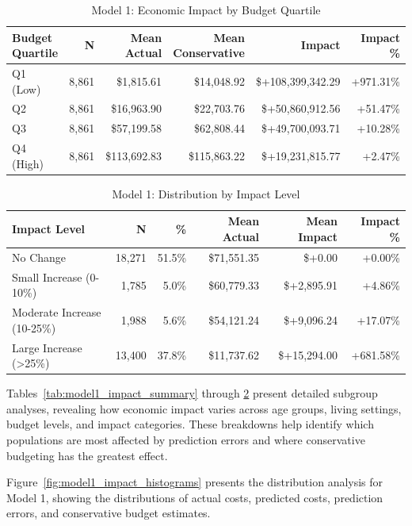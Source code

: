 \begin{table}[htbp]
\centering
\small
\caption{Model 1: Economic Impact by Budget Quartile \FiscalYear}
\label{tab:model1_impact_quartile}
\begin{tabular}{lrrrrr}
\toprule
\textbf{Budget Quartile} & \textbf{N} & \textbf{Mean Actual} & \textbf{Mean Conservative} & \textbf{Impact} & \textbf{Impact \%} \\
\midrule
Q1 (Low) & 8,861 & \$1,815.61 & \$14,048.92 & \$+108,399,342.29 & +971.31\% \\
Q2 & 8,861 & \$16,963.90 & \$22,703.76 & \$+50,860,912.56 & +51.47\% \\
Q3 & 8,861 & \$57,199.58 & \$62,808.44 & \$+49,700,093.71 & +10.28\% \\
Q4 (High) & 8,861 & \$113,692.83 & \$115,863.22 & \$+19,231,815.77 & +2.47\% \\
\bottomrule
\end{tabular}
\end{table}

\begin{table}[htbp]
\centering
\small
\caption{Model 1: Distribution by Impact Level \FiscalYear}
\label{tab:model1_impact_distribution}
\begin{tabular}{lrrrrr}
\toprule
\textbf{Impact Level} & \textbf{N} & \textbf{\%} & \textbf{Mean Actual} & \textbf{Mean Impact} & \textbf{Impact \%} \\
\midrule
No Change & 18,271 & 51.5\% & \$71,551.35 & \$+0.00 & +0.00\% \\
Small Increase (0-10\%) & 1,785 & 5.0\% & \$60,779.33 & \$+2,895.91 & +4.86\% \\
Moderate Increase (10-25\%) & 1,988 & 5.6\% & \$54,121.24 & \$+9,096.24 & +17.07\% \\
Large Increase (>25\%) & 13,400 & 37.8\% & \$11,737.62 & \$+15,294.00 & +681.58\% \\
\bottomrule
\end{tabular}
\end{table}

Tables~\ref{tab:model1_impact_summary} through \ref{tab:model1_impact_distribution} present detailed subgroup analyses, revealing how economic impact varies across age groups, living settings, budget levels, and impact categories. These breakdowns help identify which populations are most affected by prediction errors and where conservative budgeting has the greatest effect.

Figure~\ref{fig:model1_impact_histograms} presents the distribution analysis for Model 1, showing the distributions of actual costs, predicted costs, prediction errors, and conservative budget estimates.

